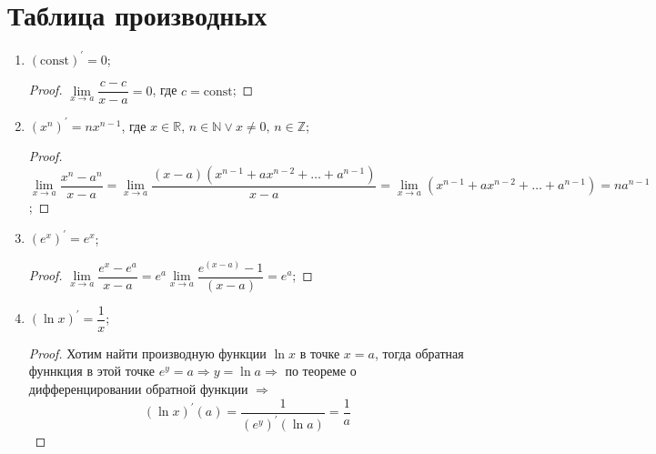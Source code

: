 \documentclass[12pt]{article}
\newcommand{\MR}{\mathbb{R}}
\theoremstyle{definition}
\begin{document}
\newpage

\section*{Таблица производных}
\begin{enumerate}[label={(\arabic*)}]
	\item $(\text{const})^\prime = 0$;
		\begin{proof}
			$\lim\limits_{x \to a}\dfrac{c - c}{x-a} = 0$, где $c = \text{const}$;
		\end{proof}
	\item $(x^n)^\prime = nx^{n-1}$, где $x \in \MR, \, n \in \mathbb{N} \vee x \neq 0, \, n \in \mathbb{Z}$;
		\begin{proof}
			$\lim\limits_{x \to a}\dfrac{x^n - a^n}{x-a} =\lim\limits_{x \to a}\dfrac{(x-a)(x^{n-1} + ax^{n-2}+ \dotsc + a^{n-1})}{x-a} = \lim\limits_{x \to a}(x^{n-1} + ax^{n-2}+ \dotsc + a^{n-1}) = na^{n-1}$;
		\end{proof}
	\item $(e^x)^\prime = e^x$;
		\begin{proof}
			$\lim\limits_{x \to a}\dfrac{e^x - e^a}{x-a} =e^a\lim\limits_{x \to a}\dfrac{e^{(x-a)} - 1}{(x-a)} = e^a$;
		\end{proof}
	\item $(\ln{x})^\prime = \dfrac{1}{x}$;
		\begin{proof}
			Хотим найти производную функции $\ln{x}$ в точке $x = a$, тогда обратная фуннкция в этой точке $e^y = a \Rightarrow y = \ln{a} \Rightarrow$ по теореме о дифференцировании обратной функции $\Rightarrow$
			$$ (\ln{x})^\prime(a) =\dfrac{1}{(e^y)^\prime(\ln{a})} = \dfrac{1}{a}$$
		\end{proof}
\end{enumerate}
\end{document}
